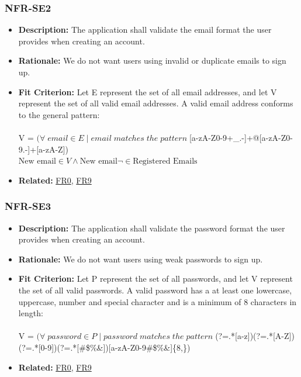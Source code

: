 \documentclass[12pt]{article}
\begin{document}
\subsubsection*{NFR-SE2}
\label{sec:SE2}
\begin{itemize}
  \item \textbf{Description:} The application shall validate the email format the user provides when creating an account.
  \item \textbf{Rationale:} We do not want users using invalid or duplicate emails to sign up.
  \item \textbf{Fit Criterion:} Let E represent the set of all email addresses, and let V represent the set of all valid email addresses. A valid email address conforms to the general pattern:\\\\
  V = $(\forall\; email \in E\;  |\; email \; matches \; the \; pattern \; $[a-zA-Z0-9+\_.-]+@[a-zA-Z0-9.-]+[a-zA-Z])\\
  $\text{New email} \in V \land \text{New email} \neg \in \text{Registered Emails}$
  \item \textbf{Related:}  \hyperref[sec:FR0]{FR0}, \hyperref[sec:FR9]{FR9}
\end{itemize}
\subsubsection*{NFR-SE3}
\label{sec:SE3}
\begin{itemize}
  \item \textbf{Description:} The application shall validate the password format the user provides when creating an account.
  \item \textbf{Rationale:} We do not want users using weak passwords to sign up.
  \item \textbf{Fit Criterion:} Let P represent the set of all passwords, and let V represent the set of all valid passwords. A valid password has a at least one lowercase, uppercase, number and special character and is a minimum of 8 characters in length:\\\\
  V = $(\forall\; password \in P\;  |\; password \; matches \; the \; pattern \; $(?=.*[a-z])(?=.*[A-Z])(?=.*[0-9])(?=.*[\#\$\%\&\*\@])[a-zA-Z0-9\#\$\%\&\*\@]\{8,\})\\
  \item \textbf{Related:} \hyperref[sec:FR0]{FR0}, \hyperref[sec:FR9]{FR9}
\end{itemize}
\end{document}
